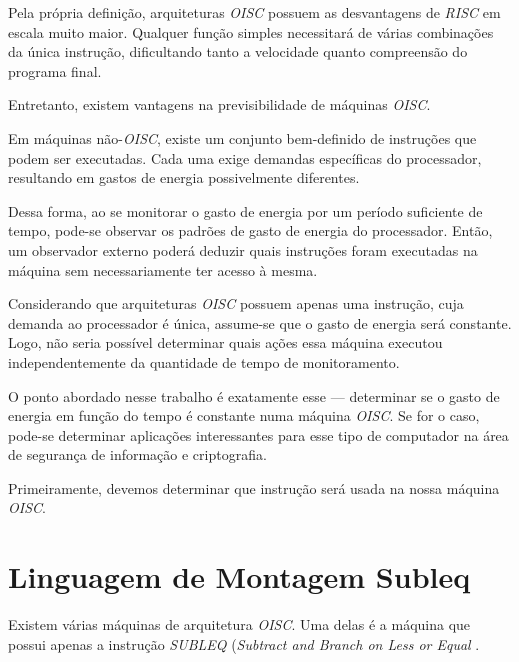 
Pela própria definição, arquiteturas \textit{OISC} possuem as desvantagens de
\textit{RISC} em escala muito maior. Qualquer função simples necessitará de
várias combinações da única instrução, dificultando tanto a velocidade quanto
compreensão do programa final.

Entretanto, existem vantagens na previsibilidade de máquinas \textit{OISC}.


Em máquinas não-\textit{OISC}, existe um conjunto bem-definido de instruções que
podem ser executadas. Cada uma exige demandas específicas do processador,
resultando em gastos de energia possivelmente diferentes.

Dessa forma, ao se monitorar o gasto de energia por um período suficiente de
tempo, pode-se observar os padrões de gasto de energia do processador. Então, um
observador externo poderá deduzir quais instruções foram executadas na máquina
sem necessariamente ter acesso à mesma.

Considerando que arquiteturas \textit{OISC} possuem apenas uma instrução, cuja
demanda ao processador é única, assume-se que o gasto de energia será
constante. Logo, não seria possível determinar quais ações essa máquina executou
independentemente da quantidade de tempo de monitoramento.

O ponto abordado nesse trabalho é exatamente esse --- determinar se o gasto de
energia em função do tempo é constante numa máquina \textit{OISC}. Se for o
caso, pode-se determinar aplicações interessantes para esse tipo de computador
na área de segurança de informação e criptografia.

Primeiramente, devemos determinar que instrução será usada na nossa máquina
\textit{OISC}.

\section{Linguagem de Montagem Subleq}
\label{sec:subleq}

Existem várias máquinas de arquitetura \textit{OISC}. Uma delas é a máquina que
possui apenas a instrução \textit{SUBLEQ} (\textit{Subtract and Branch on Less
  or Equal} \cite{subleq}.


